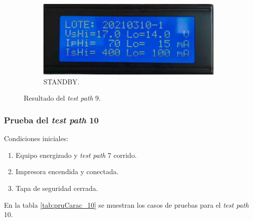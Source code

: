\begin{figure}[!htpb]
           \hfill
     \begin{subfigure}[b]{0.4\textwidth}
         \centering
         \includegraphics[width=1.1\textwidth]{./Figures/pru_fail.jpeg}
         \caption{STANDBY.}
         \label{fig:pruConf_9_4}
     \end{subfigure}
        \caption{Resultado del \textit{test path} 9.}
        \label{fig:pruConf_9_res}
\end{figure}

\subsubsection{Prueba del \textit{test path} 10}
\label{subsubsec:pruCarac_10}

Condiciones iniciales: 

\begin{enumerate}
	\item Equipo energizado y \textit{test path} 7 corrido.
	\item Impresora encendida y conectada.
	\item Tapa de seguridad cerrada.
\end{enumerate}

En la tabla \ref{tab:pruCarac_10} se muestran los casos de pruebas para el \textit{test path} 10.

\pagebreak

